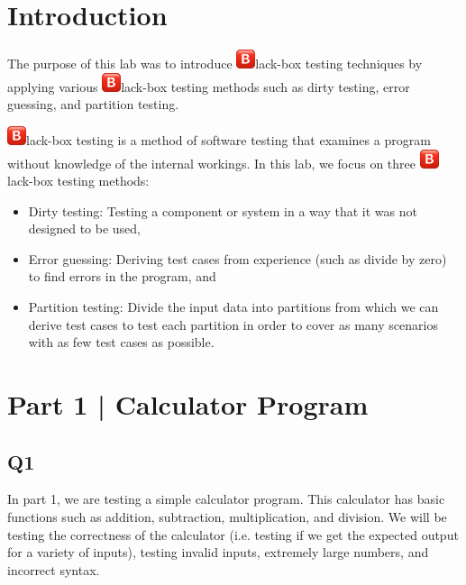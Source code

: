 \documentclass[12pt, letterpaper, titlepage]{article}
\title{\textbf{\Huge{
    \begin{center}
        ECE 322 Lab Report \#1
    \end{center}
}}}
\author{
\B enjamin Kong \\
1573684 \\
}
\newcommand{\B}{\includegraphics[height=1.5em, valign=B, raise=-0.2em]{BigB.png}}
\begin{document}
 
\onehalfspacing

\maketitle
\newpage

\section*{Introduction}
The purpose of this lab was to introduce \B lack-box testing techniques by applying various \B lack-box testing methods such as dirty testing, error guessing, and partition testing. 

\B lack-box testing is a method of software testing that examines a program without knowledge of the internal workings. In this lab, we focus on three \B lack-box testing methods: 
\begin{itemize}
    \item Dirty testing: Testing a component or system in a way that it was not designed to be used,
    \item Error guessing: Deriving test cases from experience (such as divide by zero) to find errors in the program, and
    \item Partition testing: Divide the input data into partitions from which we can derive test cases to test each partition in order to cover as many scenarios with as few test cases as possible.
\end{itemize}

\section*{Part 1 | Calculator Program}
\subsection*{Q1}
In part 1, we are testing a simple calculator program. This calculator has basic functions such as addition, subtraction, multiplication, and division. We will be testing the correctness of the calculator (i.e. testing if we get the expected output for a variety of inputs), testing invalid inputs, extremely large numbers, and incorrect syntax.
\end{document}
